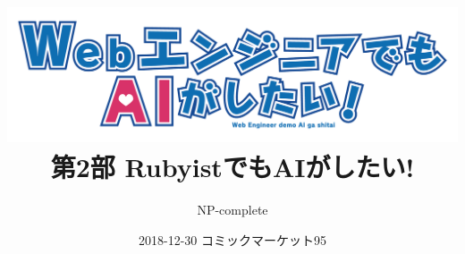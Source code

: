 \title{
  \includegraphics[width=\textwidth,height=\textheight,keepaspectratio]{./images/logo.png}
  第2部 RubyistでもAIがしたい!
}

\author{NP-complete}
\date{2018-12-30 コミックマーケット95}
\Huge
\maketitle
\normalsize
